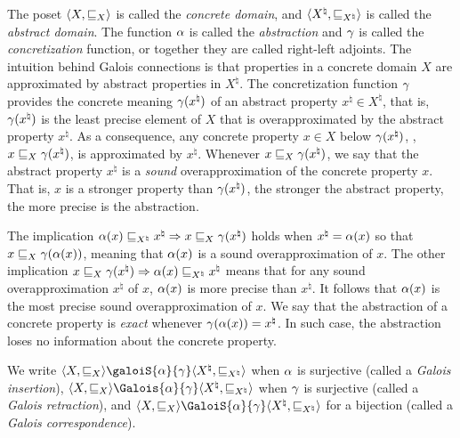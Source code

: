 The poset $\langle X, \sqsubseteq_X \rangle$ is called the \emph{concrete domain}, and $\langle {X^\natural}, \sqsubseteq_{X^\natural} \rangle$ is called the \emph{abstract domain}. The function $\alpha$ is called the \emph{abstraction} and $\gamma$ is called the \emph{concretization} function, or together they are called right-left adjoints.
The intuition behind Galois connections is that properties in a concrete domain $X$ are approximated by abstract properties in ${X^\natural}$.
The concretization function $\gamma$ provides the concrete meaning $\gamma({x^\natural})$ of an abstract property ${x^\natural}\in {X^\natural}$, that is, $\gamma({x^\natural})$ is the least precise element of $X$ that is overapproximated by the abstract property ${x^\natural}$. As a consequence, any concrete property $x\in X$ below $\gamma({x^\natural})$, \ie, $x \sqsubseteq_X \gamma({x^\natural})$, is approximated by ${x^\natural}$.
Whenever $x \sqsubseteq_X \gamma({x^\natural})$, we say that the abstract property ${x^\natural}$ is a \emph{sound} overapproximation of the concrete property $x$. That is, $x$ is a stronger property than $\gamma({x^\natural})$, the stronger the abstract property, the more precise is the abstraction.

The implication $\alpha(x) \sqsubseteq_{X^\natural} {x^\natural} \Rightarrow x \sqsubseteq_X \gamma({x^\natural})$ holds when ${x^\natural} = \alpha(x)$ so that $x \sqsubseteq_X \gamma(\alpha(x))$, meaning that $\alpha(x)$ is a sound overapproximation of $x$.
The other implication $x \sqsubseteq_X \gamma({x^\natural}) \Rightarrow \alpha(x) \sqsubseteq_{X^\natural} {x^\natural}$ means that for any sound overapproximation ${x^\natural}$ of $x$, $\alpha(x)$ is more precise than ${x^\natural}$. It follows that $\alpha(x)$ is the most precise sound overapproximation of $x$. We say that the abstraction of a concrete property is \emph{exact} whenever $\gamma(\alpha(x)) = {x^\natural}$. In such case, the abstraction loses no information about the concrete property.

We write $\tuple{X}{\sqsubseteq_X}\galoiS{\abstraction}{\concretization}\tuple{{X^\natural}}{\sqsubseteq_{X^\natural}}$ when $\alpha$ is surjective (called a \emph{Galois insertion}), $\tuple{X}{\sqsubseteq_X}\Galois{\abstraction}{\concretization}\tuple{{X^\natural}}{\sqsubseteq_{X^\natural}}$ when $\gamma$ is surjective (called a \emph{Galois retraction}), and $\tuple{X}{\sqsubseteq_X}\GaloiS{\abstraction}{\concretization}\tuple{{X^\natural}}{\sqsubseteq_{X^\natural}}$ for a bijection (called a \emph{Galois correspondence}).

